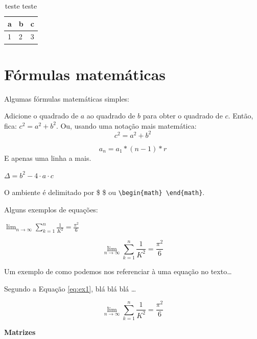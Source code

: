 \documentclass[12pt,a4paper,oneside,titlepage]{report}
\begin{document}
\lipsum[1-1]

\begin{table}
\begin{center}
\begin{tabular}{|l|l|l|}
\hline
\multicolumn{1}{|c|}{\textbf{a}} & \multicolumn{1}{c|}{\textbf{b}} & \multicolumn{1}{c|}{\textbf{c}} \\ \hline
1                                & 2                               & 3                               \\ \hline
\end{tabular}
\end{center}
\caption{teste teste}
\end{table}

\section{Fórmulas matemáticas}
Algumas fórmulas matemáticas simples:

Adicione o quadrado de $a$ ao quadrado de $b$ para obter o quadrado de $c$. Então, fica: $c^2 = a^2+b^2$. Ou, usando uma notação mais matemática: 
\begin{displaymath}
c^{2}=a^{2}+b^{2}
\end{displaymath}


\[
a_n = a_1*(n-1)*r
\]
E apenas uma linha a mais.

$\Delta = b^2 - 4\cdot a \cdot c$

O ambiente é delimitado por \$ \$ ou \verb|\begin{math} \end{math}|.

Alguns exemplos de equações:

	$\lim_{n \to \infty} \sum_{k=1}^n \frac{1}{K^2} = \frac{\pi^2}{6}$

	\begin{displaymath}
		\lim_{n \to \infty} \sum_{k=1}^n \frac{1}{K^2} = \frac{\pi^2}{6}
	\end{displaymath}

Um exemplo de como podemos nos referenciar à uma equação no texto\dots

Segundo a Equação \ref{eq:ex1}, blá blá blá \dots

	\begin{equation}
		\lim_{n \to \infty} \sum_{k=1}^n \frac{1}{K^2} = \frac{\pi^2}{6}				
		\label{eq:ex1}		
	\end{equation}

\textbf{Matrizes}
\end{document}
